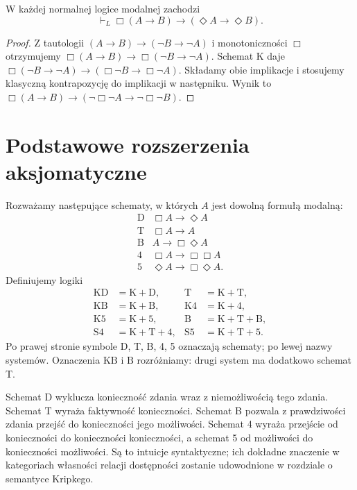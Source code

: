 \begin{stwierdzenie}
\label{prop:ncl-modal-mixed-mp}
W każdej normalnej logice modalnej zachodzi
\[
 \vdash_L\Box(A\to B)\to(\Diamond A\to\Diamond B).
\]
\end{stwierdzenie}
\begin{proof}
Z tautologii $(A\to B)\to(\neg B\to\neg A)$
i monotoniczności $\Box$ otrzymujemy
$\Box(A\to B)\to\Box(\neg B\to\neg A)$.
Schemat K daje
$\Box(\neg B\to\neg A)\to
(\Box\neg B\to\Box\neg A)$.
Składamy obie implikacje i stosujemy klasyczną
kontrapozycję do implikacji w następniku.
Wynik to
$\Box(A\to B)\to
(\neg\Box\neg A\to\neg\Box\neg B)$.
\end{proof}

\section{Podstawowe rozszerzenia aksjomatyczne}

\begin{definicja}[Schematy D, T, B, 4 i 5]
\label{def:ncl-modal-axiom-schemes}
Rozważamy następujące schematy, w których $A$
jest dowolną formułą modalną:
\[
\begin{array}{c|l}
 \mathrm D&\Box A\to\Diamond A\\
 \mathrm T&\Box A\to A\\
 \mathrm B&A\to\Box\Diamond A\\
 4&\Box A\to\Box\Box A\\
 5&\Diamond A\to\Box\Diamond A.
\end{array}
\]
Definiujemy logiki
\[
\begin{aligned}
 \mathrm{KD}&=\mathrm K+\mathrm D,&
 \mathrm T&=\mathrm K+\mathrm T,\\
 \mathrm{KB}&=\mathrm K+\mathrm B,&
 \mathrm{K4}&=\mathrm K+4,\\
 \mathrm{K5}&=\mathrm K+5,&
 \mathrm B&=\mathrm K+\mathrm T+\mathrm B,\\
 \mathrm{S4}&=\mathrm K+\mathrm T+4,&
 \mathrm{S5}&=\mathrm K+\mathrm T+5.
\end{aligned}
\]
Po prawej stronie symbole D, T, B, 4, 5 oznaczają
schematy; po lewej nazwy systemów. Oznaczenia
$\mathrm{KB}$ i $\mathrm B$ rozróżniamy: drugi
system ma dodatkowo schemat T.
\end{definicja}

Schemat D wyklucza konieczność zdania wraz
z niemożliwością tego zdania.
Schemat T wyraża faktywność konieczności.
Schemat B pozwala z prawdziwości zdania przejść
do konieczności jego możliwości.
Schemat 4 wyraża przejście od konieczności
do konieczności konieczności, a schemat 5
od możliwości do konieczności możliwości.
Są to intuicje syntaktyczne; ich dokładne znaczenie
w kategoriach własności relacji dostępności
zostanie udowodnione w rozdziale o semantyce Kripkego.

